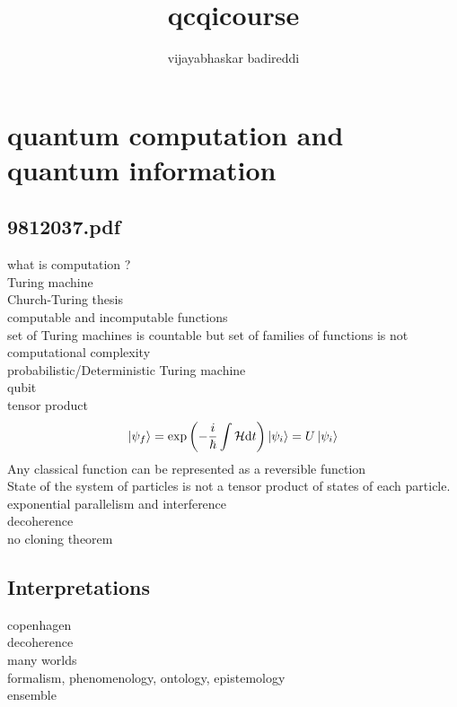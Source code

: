 \documentclass[12pt] {article}
\title{qcqicourse}
\author{vijayabhaskar badireddi}
\begin{document}
        
\section*{quantum computation and quantum information}
\subsection*{9812037.pdf}
what is computation ?\\
Turing machine\\
Church-Turing thesis\\
computable and incomputable functions\\
set of Turing machines is countable but set of families of functions is not\\
computational complexity\\
probabilistic/Deterministic Turing machine\\
qubit\\
tensor product\\
\[\ket{\psi_f}=\exp\qty(-\frac{i}{\hbar}\int \mathcal{H} \dd t)\ket{\psi_i}=U\ket{\psi_i}\]
Any classical function can be represented as a reversible function\\
State of the system of particles is not a tensor product of states of each particle.\\
exponential parallelism and interference\\  
decoherence\\
no cloning theorem\\
\newpage
\subsection*{Interpretations}
copenhagen\\
decoherence\\
many worlds\\
formalism, phenomenology, ontology, epistemology\\
ensemble\\
\end{document}
